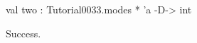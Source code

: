 \runverbatimtrue
{}
\begin{RunVerbatimMsg}
val two : Tutorial0033.modes * 'a -D-> int
\end{RunVerbatimMsg}
\begin{RunVerbatimErr}
Success.
\end{RunVerbatimErr}
